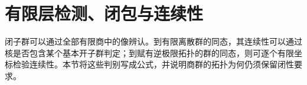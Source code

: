 
\section{有限层检测、闭包与连续性}
\label{b1:sec:2205}

闭子群可以通过全部有限商中的像辨认。到有限离散群的同态，其连续性可以通过核是否包含某个基本开子群判定；到赋有逆极限拓扑的群的同态，则可逐个有限坐标检验连续性。本节将这些判别写成公式，并说明商群的拓扑为何仍须保留闭性要求。

%
%

